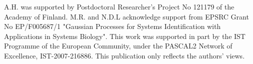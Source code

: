 \documentclass{pnastwo}
\begin{document}
\begin{article}
\begin{materials}
\end{materials}

\begin{acknowledgments}
A.H. was supported by Postdoctoral Researcher's Project No 121179 of the Academy of Finland.
M.R. and N.D.L acknowledge support from EPSRC Grant No EP/F005687/1 "Gaussian Processes for Systems Identification with Applications in Systems Biology". 
This work was supported in part by the IST Programme of the European Community, under the PASCAL2 Network of Excellence, IST-2007-216886. This publication only reflects the authors' views.
\end{acknowledgments}




%
\end{article}

\end{document}
